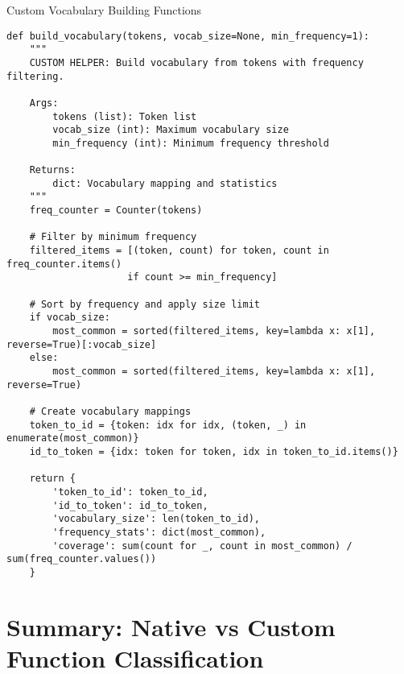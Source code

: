 \documentclass[11pt,a4paper]{article}
\begin{document}
\begin{custombox}{Custom Vocabulary Building Functions}

\begin{lstlisting}[caption=Custom vocabulary construction helper]
def build_vocabulary(tokens, vocab_size=None, min_frequency=1):
    """
    CUSTOM HELPER: Build vocabulary from tokens with frequency filtering.
    
    Args:
        tokens (list): Token list
        vocab_size (int): Maximum vocabulary size
        min_frequency (int): Minimum frequency threshold
        
    Returns:
        dict: Vocabulary mapping and statistics
    """
    freq_counter = Counter(tokens)
    
    # Filter by minimum frequency
    filtered_items = [(token, count) for token, count in freq_counter.items() 
                     if count >= min_frequency]
    
    # Sort by frequency and apply size limit
    if vocab_size:
        most_common = sorted(filtered_items, key=lambda x: x[1], reverse=True)[:vocab_size]
    else:
        most_common = sorted(filtered_items, key=lambda x: x[1], reverse=True)
    
    # Create vocabulary mappings
    token_to_id = {token: idx for idx, (token, _) in enumerate(most_common)}
    id_to_token = {idx: token for token, idx in token_to_id.items()}
    
    return {
        'token_to_id': token_to_id,
        'id_to_token': id_to_token,
        'vocabulary_size': len(token_to_id),
        'frequency_stats': dict(most_common),
        'coverage': sum(count for _, count in most_common) / sum(freq_counter.values())
    }
\end{lstlisting}
\end{custombox}

\section{Summary: Native vs Custom Function Classification}
\end{document}
